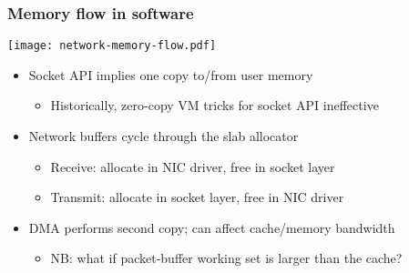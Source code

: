 \begin{frame}
  \frametitle{Memory flow in software}

  \begin{center}
    \texttt{[image: network-memory-flow.pdf]}
  \end{center}

  \pause

  \begin{itemize}
    \item Socket API implies one copy to/from user memory
    \begin{itemize}
      \item Historically, zero-copy VM tricks for socket API ineffective
    \end{itemize}

    \medskip
    \pause

    \item Network buffers cycle through the slab allocator
    \begin{itemize}
      \item Receive: allocate in NIC driver, free in socket layer
      \item Transmit: allocate in socket layer, free in NIC driver
    \end{itemize}

    \medskip
    \pause

    \item DMA performs second copy; can affect cache/memory bandwidth
    \begin{itemize}
      \item NB: what if packet-buffer working set is larger than the cache?
    \end{itemize}
  \end{itemize}
\end{frame}

